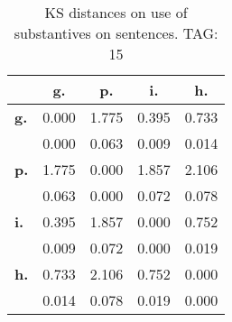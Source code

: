 \begin{table}[h!]
\begin{center}
\begin{tabular}{| l || c | c | c | c |}\hline
 & {\bf g.} & {\bf p.} & {\bf i.} & {\bf h.} \\\hline\hline
{\bf g.} & 0.000 & 1.775 & 0.395 & 0.733 \\
{\bf } & 0.000 & 0.063 & 0.009 & 0.014 \\\hline
{\bf p.} & 1.775 & 0.000 & 1.857 & 2.106 \\
{\bf } & 0.063 & 0.000 & 0.072 & 0.078 \\\hline
{\bf i.} & 0.395 & 1.857 & 0.000 & 0.752 \\
{\bf } & 0.009 & 0.072 & 0.000 & 0.019 \\\hline
{\bf h.} & 0.733 & 2.106 & 0.752 & 0.000 \\
{\bf } & 0.014 & 0.078 & 0.019 & 0.000 \\\hline
\end{tabular}
\caption{KS distances on use of substantives on sentences. TAG: 15}
\end{center}
\end{table}